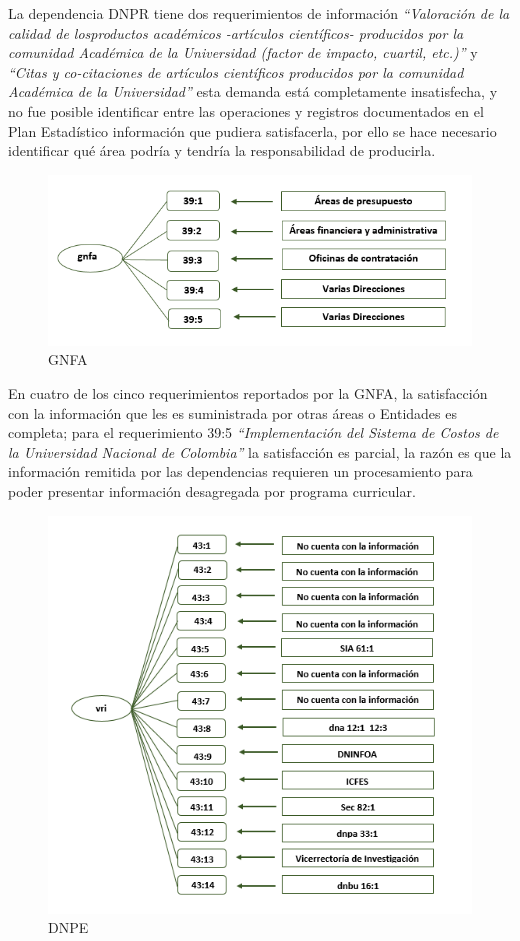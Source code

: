 \documentclass[
]{book}
\begin{document}
La dependencia DNPR tiene dos requerimientos de información \emph{``Valoración de la calidad de losproductos académicos -artículos científicos- producidos por la comunidad Académica de la Universidad (factor de impacto, cuartil, etc.)''} y \emph{``Citas y co-citaciones de artículos científicos producidos por la comunidad Académica de la Universidad''} esta demanda está completamente
insatisfecha, y no fue posible identificar entre las operaciones y registros documentados en el Plan
Estadístico información que pudiera satisfacerla, por ello se hace necesario identificar qué área
podría y tendría la responsabilidad de producirla.

\begin{figure}

{\centering \includegraphics[width=0.75\linewidth]{Imagenes/ima8} 

}

\caption{GNFA}\label{fig:unnamed-chunk-36}
\end{figure}

En cuatro de los cinco requerimientos reportados por la GNFA, la satisfacción con la información
que les es suministrada por otras áreas o Entidades es completa; para el requerimiento 39:5
\emph{``Implementación del Sistema de Costos de la Universidad Nacional de Colombia''} la satisfacción es
parcial, la razón es que la información remitida por las dependencias requieren un procesamiento
para poder presentar información desagregada por programa curricular.

\begin{figure}

{\centering \includegraphics[width=0.6\linewidth]{Imagenes/ima9} 

}

\caption{DNPE}\label{fig:unnamed-chunk-37}
\end{figure}
\end{document}
